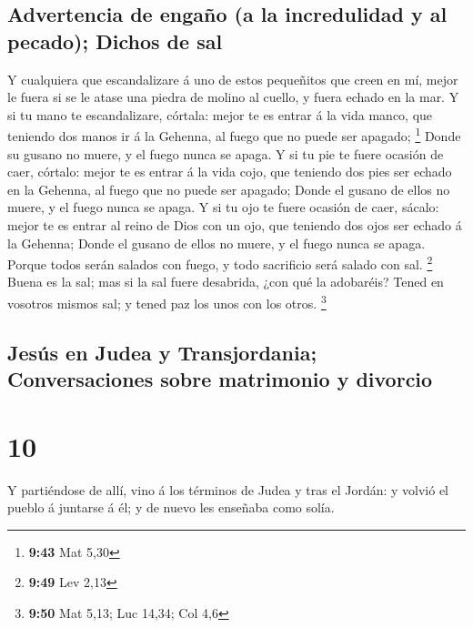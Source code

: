 \hypertarget{advertencia-de-engauxf1o-a-la-incredulidad-y-al-pecado-dichos-de-sal}{%
\subsection{Advertencia de engaño (a la incredulidad y al pecado);
Dichos de
sal}\label{advertencia-de-engauxf1o-a-la-incredulidad-y-al-pecado-dichos-de-sal}}

 Y cualquiera que escandalizare á uno de estos pequeñitos
que creen en mí, mejor le fuera si se le atase una piedra de molino al
cuello, y fuera echado en la mar.  Y si tu mano te
escandalizare, córtala: mejor te es entrar á la vida manco, que teniendo
dos manos ir á la Gehenna, al fuego que no puede ser apagado;
\footnote{\textbf{9:43} Mat 5,30}  Donde su gusano no
muere, y el fuego nunca se apaga.  Y si tu pie te fuere
ocasión de caer, córtalo: mejor te es entrar á la vida cojo, que
teniendo dos pies ser echado en la Gehenna, al fuego que no puede ser
apagado;  Donde el gusano de ellos no muere, y el fuego
nunca se apaga.  Y si tu ojo te fuere ocasión de caer,
sácalo: mejor te es entrar al reino de Dios con un ojo, que teniendo dos
ojos ser echado á la Gehenna;  Donde el gusano de ellos
no muere, y el fuego nunca se apaga.  Porque todos serán
salados con fuego, y todo sacrificio será salado con sal. \footnote{\textbf{9:49}
  Lev 2,13}  Buena es la sal; mas si la sal fuere
desabrida, ¿con qué la adobaréis? Tened en vosotros mismos sal; y tened
paz los unos con los otros. \footnote{\textbf{9:50} Mat 5,13; Luc 14,34;
  Col 4,6}

\hypertarget{jesuxfas-en-judea-y-transjordania-conversaciones-sobre-matrimonio-y-divorcio}{%
\subsection{Jesús en Judea y Transjordania; Conversaciones sobre
matrimonio y
divorcio}\label{jesuxfas-en-judea-y-transjordania-conversaciones-sobre-matrimonio-y-divorcio}}

\hypertarget{section-9}{%
\section{10}\label{section-9}}

 Y partiéndose de allí, vino á los términos de Judea y
tras el Jordán: y volvió el pueblo á juntarse á él; y de nuevo les
enseñaba como solía.

